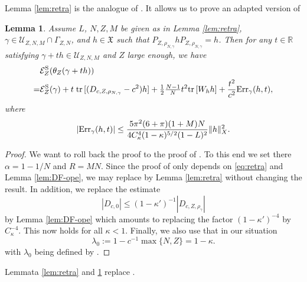 \documentclass[a4paper]{amsart}
\newtheorem{lemma}{Lemma}
\def\tr{{\rm tr \,}}
\def\cE{{\mathcal E}}
\def\cU{{\mathcal U}}
\def\gX{\mathfrak{X}}
\begin{document}
Lemma \ref{lem:retra} is the analogue of \cite[Lemma
2.3]{Meng2023}. It allows us to prove an adapted version of
\cite[Proposition 3.2]{Meng2023}
\begin{lemma} \label{approx}
  Assume $L$, $N,Z,M$ be given as in Lemma \ref{lem:retra},
  $\gamma\in \cU_{Z,N,M}\cap \Gamma_{Z,N}$, and $h\in\gX$ such that
  $P_{Z, \rho_{N,\gamma}}h P_{Z, \rho_{N,\gamma}}=h$. Then for any
  $t\in\mathbb{R}$ satisfying $\gamma+th\in \cU_{Z,N,M}$ and $Z$ large
  enough, we have
  \begin{equation}\label{eq:sed-diff}
    \begin{split}
      &\cE_Z^{\rm S}(\theta_Z(\gamma+th))\\
      =&\cE_Z^{\rm S}(\gamma)+t\;\tr [(D_{c,Z,\rho_{N,\gamma}}-c^2)h]+\tfrac12\tfrac{N-1}N t^2\tr[W_h h]+\frac{t^2}{c^2} {\rm Err}_{\gamma}(h,t),
    \end{split}
  \end{equation}
where 
\begin{align}
     |{\rm Err}_{\gamma}(h,t)|\leq \frac{5\pi^2(6+\pi)(1+M)N}{4C_{\kappa}^4(1-\kappa)^{5/2}(1-L)^2}\|h\|_X^2.
\end{align}
\end{lemma}
\begin{proof}
  We want to roll back the proof to the proof of \cite[Proposition
  3.2]{Meng2023}. To this end we set there $\alpha=1-1/N$ and
  $R=MN$. Since the proof of \cite[Proposition 3.2]{Meng2023} only
  depends on \eqref{eq:retra} and Lemma \ref{lem:DF-ope}, we may
  replace \cite[Lemma 2.3]{Meng2023} by Lemma \ref{lem:retra} without
  changing the result. In addition, we replace the estimate
\begin{equation}
    |D_{c,0}|\leq (1-\kappa')^{-1}|D_{c,Z,\rho_{\gamma}}|
  \end{equation}
  by Lemma \ref{lem:DF-ope} which amounts to replacing the factor
  $(1-\kappa')^{-4}$ by $C_{\kappa}^{-4}$. This now holds for all
  $\kappa<1$. Finally, we also use that in our situation
\begin{equation}
    \lambda_0:=1-c^{-1}\max\{N,Z\}=1-\kappa.
\end{equation}
with $\lambda_0$ being defined by \cite[Assumption 2.2]{Meng2023}.
\end{proof}
Lemmata \ref{lem:retra} and \ref{approx} replace
\cite[Theorem 2.10]{Sere2023}.
\end{document}
